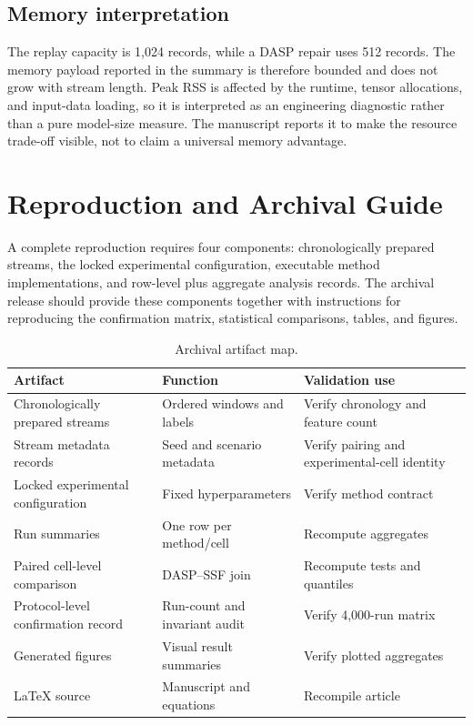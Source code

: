 \subsection{Memory interpretation}
The replay capacity is 1,024 records, while a DASP repair uses 512 records. The memory payload reported in the summary is therefore bounded and does not grow with stream length. Peak RSS is affected by the runtime, tensor allocations, and input-data loading, so it is interpreted as an engineering diagnostic rather than a pure model-size measure. The manuscript reports it to make the resource trade-off visible, not to claim a universal memory advantage.

\section{Reproduction and Archival Guide}
\label{app:archival-guide}

A complete reproduction requires four components: chronologically prepared streams, the locked experimental configuration, executable method implementations, and row-level plus aggregate analysis records. The archival release should provide these components together with instructions for reproducing the confirmation matrix, statistical comparisons, tables, and figures.

\begin{table}[t]
\caption{Archival artifact map.}
\label{tab:artifact-map}
\centering
\begin{tabular}{p{}p{}p{}}
\toprule
Artifact & Function & Validation use\\
\midrule
Chronologically prepared streams & Ordered windows and labels & Verify chronology and feature count\\
Stream metadata records & Seed and scenario metadata & Verify pairing and experimental-cell identity\\
Locked experimental configuration & Fixed hyperparameters & Verify method contract\\
Run summaries & One row per method/cell & Recompute aggregates\\
Paired cell-level comparison & DASP--SSF join & Recompute tests and quantiles\\
Protocol-level confirmation record & Run-count and invariant audit & Verify 4,000-run matrix\\
Generated figures & Visual result summaries & Verify plotted aggregates\\
LaTeX source & Manuscript and equations & Recompile article\\
\bottomrule
\end{tabular}
\end{table}

